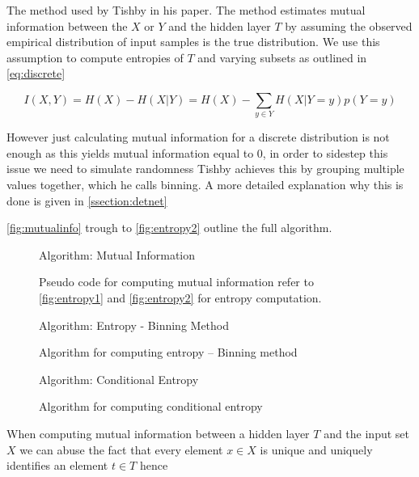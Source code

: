 \documentclass[dissertation.tex]{subfiles}
\begin{document}
  The method used by Tishby in his paper. The method estimates mutual
  information between the $X$ or $Y$ and the hidden layer $T$ by assuming the
  observed empirical distribution of input samples is the true distribution. We
  use this assumption to compute entropies of $T$ and varying subsets as
  outlined in \autoref{eq:discrete}

\begin{equation}
  I(X, Y) = H(X) - H(X|Y) = H(X) - \sum _{y\in Y} H(X|Y = y)p(Y = y)
\label{eq:discrete}
\end{equation} 


  However just calculating mutual information for a discrete distribution is not
  enough as this yields mutual information equal to 0, in order to sidestep this
  issue we need to simulate randomness Tishby achieves this by grouping multiple
  values together, which he calls binning. A more detailed explanation why this
  is done is given in \autoref{ssection:detnet}

   \autoref{fig:mutualinfo} trough to \autoref{fig:entropy2} outline the full
   algorithm.
\begin{figure}[H]
    \begin{pythonfigure}
      Algorithm: Mutual Information
    \end{pythonfigure}
    \caption{Pseudo code for computing mutual information refer to
    \autoref{fig:entropy1} and \autoref{fig:entropy2} for entropy computation.}
    \label{fig:mutualinfo}
\end{figure}

\begin{figure}[H]
    \begin{pythonfigure}
      Algorithm: Entropy - Binning Method
    \end{pythonfigure}
    \caption{Algorithm for computing entropy -- Binning method}
    \label{fig:entropy1}
\end{figure} 

\begin{figure}[H]
    \begin{pythonfigure}
      Algorithm: Conditional Entropy
    \end{pythonfigure}
    \caption{Algorithm for computing conditional entropy}
    \label{fig:entropy2}
\end{figure}

When computing mutual information between a hidden layer $T$ and the input set
$X$ we can abuse the fact that every element $x\in X$ is unique and uniquely
identifies an element $t\in T$ hence 
\end{document}
